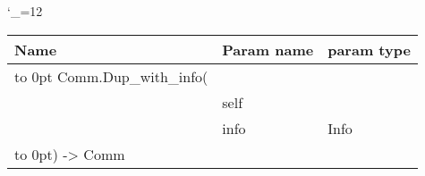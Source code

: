 \begingroup \catcode`\_=12 \tt
\begin{tabular}{lll}
\toprule
\textrm{Name}&\textrm{Param name}&\textrm{param type}\\
\midrule
\hbox to 0pt {Comm.Dup_with_info(\hss}\\
& self\\
& info & Info\\
\hbox to 0pt{) -> Comm\hss}\\
\bottomrule
\end{tabular}
\endgroup
